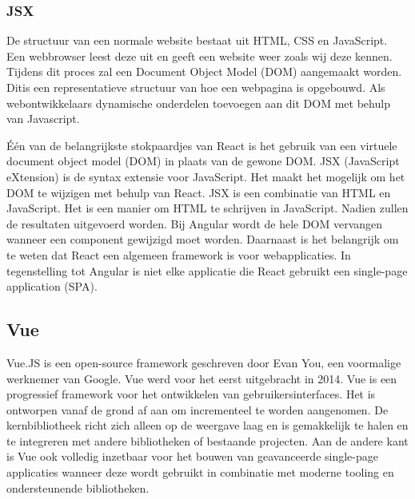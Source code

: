 \subsubsection*{JSX}
De structuur van een normale website bestaat uit HTML, CSS en JavaScript. Een
webbrowser leest deze uit en geeft een website weer zoals wij deze kennen.
Tijdens dit proces zal een Document Object Model (DOM) aangemaakt worden. Ditis
een representatieve structuur van hoe een webpagina is opgebouwd. Als
webontwikkelaars dynamische onderdelen toevoegen aan dit DOM met behulp van
Javascript.

Één van de belangrijkste stokpaardjes van React is het gebruik van een virtuele document object model (DOM) in plaats van de gewone DOM. JSX (JavaScript eXtension) is de syntax extensie voor JavaScript. Het maakt het mogelijk om het DOM te wijzigen met behulp van React. JSX is een combinatie van HTML en JavaScript. Het is een manier om HTML te schrijven in JavaScript. Nadien zullen de resultaten uitgevoerd worden. Bij Angular wordt de hele DOM vervangen wanneer een component gewijzigd moet worden. Daarnaast is het belangrijk om te weten dat React een algemeen framework is voor webapplicaties. In tegenstelling tot Angular is niet elke applicatie die React gebruikt een single-page application (SPA).

\subsection*{Vue}%
Vue.JS is een open-source framework geschreven door Evan You, een voormalige
werknemer van Google. Vue werd voor het eerst uitgebracht in 2014. Vue is een
progressief framework voor het ontwikkelen van gebruikersinterfaces. Het is
ontworpen vanaf de grond af aan om incrementeel te worden aangenomen. De
kernbibliotheek richt zich alleen op de weergave laag en is gemakkelijk te
halen en te integreren met andere bibliotheken of bestaande projecten. Aan de
andere kant is Vue ook volledig inzetbaar voor het bouwen van geavanceerde
single-page applicaties wanneer deze wordt gebruikt in combinatie met moderne
tooling en ondersteunende bibliotheken.\autocite{VueGithub2024}

